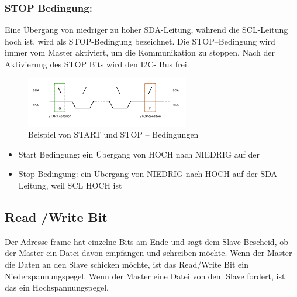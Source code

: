 \documentclass[conference]{IEEEtran}
\begin{document}
\subsubsection{STOP Bedingung: }
Eine Übergang von niedriger zu hoher SDA-Leitung, während die SCL-Leitung hoch ist, wird als STOP-Bedingung bezeichnet. Die STOP–Bedingung wird immer vom Master aktiviert, um die Kommunikation zu stoppen. Nach der Aktivierung des STOP Bits wird den I2C- Bus frei. 
\begin{figure}
	\centering
	\includegraphics[width=0.7\linewidth]{fig6}
	\caption{Beispiel von START und STOP – Bedingungen}
	\label{fig:fig6}
\end{figure}

\begin{itemize}
	\item	Start Bedingung: ein Übergang von HOCH nach NIEDRIG auf der 
	\item  Stop Bedingung: ein Übergang von NIEDRIG nach HOCH auf der SDA-Leitung, weil SCL HOCH ist
\end{itemize}

\subsection{Read /Write Bit}

Der Adresse-frame hat einzelne Bits am Ende und sagt dem Slave Bescheid, ob der Master ein Datei davon empfangen und schreiben möchte. Wenn der Master die Daten an den Slave schicken möchte, ist das Read/Write Bit ein Niederspannungspegel. Wenn der Master eine Datei von dem Slave fordert, ist das ein Hochspannungspegel. 
\end{document}
